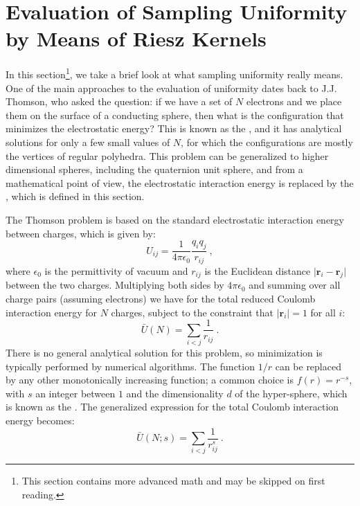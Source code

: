 

\section{Evaluation of Sampling Uniformity by Means of Riesz Kernels}\label{\chabbr:sec:Riesz}
In this section\footnote{This section contains more advanced math and may be skipped on first reading.}, we take a brief look at what sampling uniformity really means.  One of the main approaches to the evaluation of uniformity dates back to J.J. Thomson, who asked the question: if we have a set of $N$ electrons and we place them on the surface of a conducting sphere, then what is the configuration that minimizes the electrostatic energy? This is known as the , and it has analytical solutions for only a few small values of $N$, for which the configurations are mostly the vertices of regular polyhedra.  This problem can be generalized to higher dimensional spheres, including the quaternion unit sphere, and from a mathematical point of view, the electrostatic interaction energy is replaced by the , which is defined in this section.  

The Thomson problem is based on the standard electrostatic interaction energy between charges, which is given by:
\[
	U_{ij} = \frac{1}{4\pi\epsilon_0}\frac{q_iq_j}{r_{ij}}\ ,
\]
where $\epsilon_0$ is the permittivity of vacuum and $r_{ij}$ is the Euclidean distance $\vert\mathbf{r}_i-\mathbf{r}_j\vert$ between the two charges. Multiplying both sides by $4\pi\epsilon_0$ and summing over all charge pairs (assuming electrons) we have for the total reduced Coulomb interaction energy for $N$ charges, subject to the constraint that $\vert\mathbf{r}_i\vert=1$ for all $i$:
\[
	\bar{U}(N) = \sum_{i<j} \frac{1}{r_{ij}}\ .
\]
There is no general analytical solution for this problem, so minimization is typically performed by numerical algorithms. The function $1/r$ can be replaced by any other monotonically increasing function; a common choice is $f(r)=r^{-s}$, with $s$ an integer between $1$ and the dimensionality $d$ of the hyper-sphere, which is known as the .  The generalized expression for the total Coulomb interaction energy becomes:
\[
	\bar{U}(N;s) = \sum_{i<j} \frac{1}{r^s_{ij}}\ .
\]

